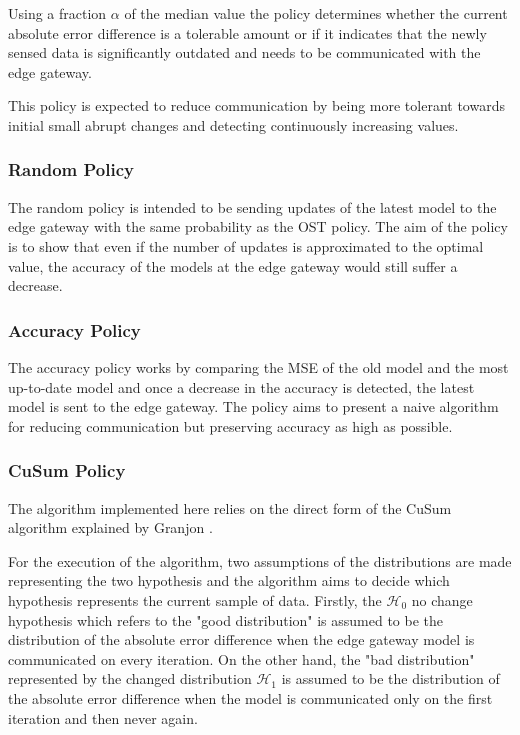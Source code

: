 \documentclass{mpaper}
\begin{document}
Using a fraction $\alpha$ of the median value the policy determines whether the current absolute error difference is a tolerable amount or if it indicates that the newly sensed data is significantly outdated and needs to be communicated with the edge gateway.

This policy is expected to reduce communication by being more tolerant towards initial small abrupt changes and detecting continuously increasing values.

\subsubsection{Random Policy}
The random policy is intended to be sending updates of the latest model to the edge gateway with the same probability as the OST policy.
The aim of the policy is to show that even if the number of updates is approximated to the optimal value, the accuracy of the models at the edge gateway would still suffer a decrease.

\subsubsection{Accuracy Policy}
The accuracy policy works by comparing the MSE of the old model and the most up-to-date model and once a decrease in the accuracy is detected, the latest model is sent to the edge gateway.
The policy aims to present a naive algorithm for reducing communication but preserving accuracy as high as possible.

\subsubsection{CuSum Policy}
The algorithm implemented here relies on the direct form of the CuSum algorithm explained by Granjon \cite{cusum_pierre}.

For the execution of the algorithm, two assumptions of the distributions are made representing the two hypothesis and the algorithm aims to decide which hypothesis represents the current sample of data. 
Firstly, the $\mathcal{H}_0$ no change hypothesis which refers to the "good distribution" is assumed to be the distribution of the absolute error difference when the edge gateway model is communicated on every iteration. On the other hand, the "bad distribution" represented by the changed distribution $\mathcal{H}_1$ is assumed to be the distribution of the absolute error difference when the model is communicated only on the first iteration and then never again. 
\end{document}
